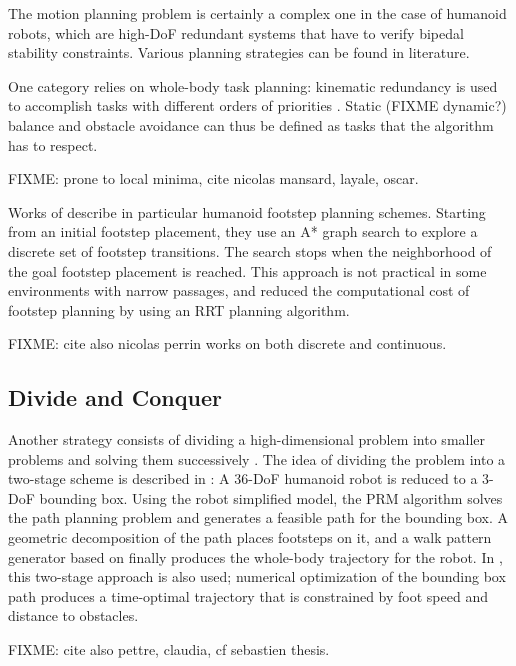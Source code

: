 The motion planning problem is certainly a complex one in the case of
humanoid robots, which are high-DoF redundant systems that have to
verify bipedal stability constraints. Various planning strategies can
be found in literature.

One category relies on whole-body task planning: kinematic redundancy
is used to accomplish tasks with different orders of priorities
\cite{khat04,kano09}. Static (FIXME dynamic?) balance and obstacle
avoidance can thus be defined as tasks that the algorithm has to
respect.

FIXME: prone to local minima, cite nicolas mansard, layale,
oscar.

Works of \cite{kuff01,ches05} describe in particular humanoid footstep
planning schemes. Starting from an initial footstep placement, they
use an A* graph search \cite{hart68} to explore a discrete set of
footstep transitions. The search stops when the neighborhood of the
goal footstep placement is reached. This approach is not practical in
some environments with narrow passages, and \cite{xia09} reduced the
computational cost of footstep planning by using an RRT planning
algorithm.

FIXME: cite also nicolas perrin works on both discrete and
continuous.

\subsection{Divide and Conquer}
\label{subsec:chap1-bounding-box}

Another strategy consists of dividing a high-dimensional problem into
smaller problems and solving them successively \cite{zhan09}. The idea
of dividing the problem into a two-stage scheme is described in
\cite{yosh08}: A 36-DoF humanoid robot is reduced to a 3-DoF bounding
box. Using the robot simplified model, the PRM algorithm solves the
path planning problem and generates a feasible path for the bounding
box. A geometric decomposition of the path places footsteps on it, and
a walk pattern generator based on \cite{kaji03} finally produces the
whole-body trajectory for the robot. In \cite{moul10}, this two-stage
approach is also used; numerical optimization of the bounding box path
produces a time-optimal trajectory that is constrained by foot speed
and distance to obstacles.

FIXME: cite also pettre, claudia, cf sebastien thesis.

